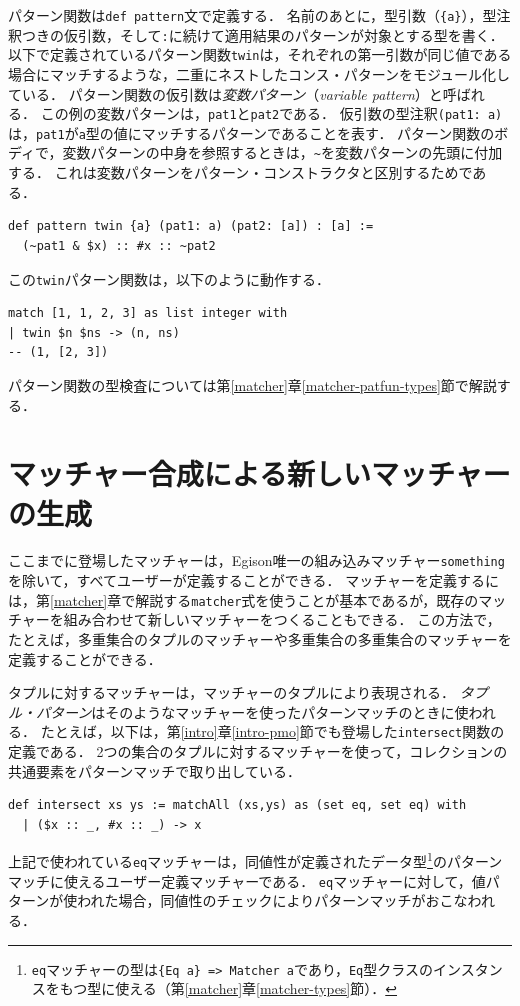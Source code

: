 パターン関数は\lstinline{def pattern}文で定義する．
名前のあとに，型引数（\lstinline|{a}|），型注釈つきの仮引数，そして\lstinline{:}に続けて適用結果のパターンが対象とする型を書く．
以下で定義されているパターン関数\lstinline{twin}は，それぞれの第一引数が同じ値である場合にマッチするような，二重にネストしたコンス・パターンをモジュール化している．
パターン関数の仮引数は\emph{変数パターン}（\emph{variable pattern}）と呼ばれる．
この例の変数パターンは，\lstinline{pat1}と\lstinline{pat2}である．
仮引数の型注釈\lstinline{(pat1: a)}は，\lstinline{pat1}が\lstinline{a}型の値にマッチするパターンであることを表す．
パターン関数のボディで，変数パターンの中身を参照するときは，\lstinline{~}を変数パターンの先頭に付加する．
これは変数パターンをパターン・コンストラクタと区別するためである．
\begin{lstlisting}[language=egison,numbers=none]
def pattern twin {a} (pat1: a) (pat2: [a]) : [a] :=
  (~pat1 & $x) :: #x :: ~pat2
\end{lstlisting}
この\lstinline{twin}パターン関数は，以下のように動作する．
\begin{lstlisting}[language=egison,numbers=none]
match [1, 1, 2, 3] as list integer with
| twin $n $ns -> (n, ns)
-- (1, [2, 3])
\end{lstlisting}
パターン関数の型検査については第\ref{matcher}章\ref{matcher-patfun-types}節で解説する．

\section{マッチャー合成による新しいマッチャーの生成}\label{quick-matcher-composition}

ここまでに登場したマッチャーは，Egison唯一の組み込みマッチャー\lstinline{something}を除いて，すべてユーザーが定義することができる．
マッチャーを定義するには，第\ref{matcher}章で解説する\lstinline{matcher}式を使うことが基本であるが，既存のマッチャーを組み合わせて新しいマッチャーをつくることもできる．
この方法で，たとえば，多重集合のタプルのマッチャーや多重集合の多重集合のマッチャーを定義することができる．

タプルに対するマッチャーは，マッチャーのタプルにより表現される．
\emph{タプル・パターン}はそのようなマッチャーを使ったパターンマッチのときに使われる．
たとえば，以下は，第\ref{intro}章\ref{intro-pmo}節でも登場した\lstinline{intersect}関数の定義である．
2つの集合のタプルに対するマッチャーを使って，コレクションの共通要素をパターンマッチで取り出している．
\begin{lstlisting}[language=egison,numbers=none]
def intersect xs ys := matchAll (xs,ys) as (set eq, set eq) with
  | ($x :: _, #x :: _) -> x
\end{lstlisting}
上記で使われている\lstinline{eq}マッチャーは，同値性が定義されたデータ型\footnote{\lstinline{eq}マッチャーの型は\lstinline|{Eq a} => Matcher a|であり，\lstinline{Eq}型クラスのインスタンスをもつ型に使える（第\ref{matcher}章\ref{matcher-types}節）．}のパターンマッチに使えるユーザー定義マッチャーである．
\lstinline{eq}マッチャーに対して，値パターンが使われた場合，同値性のチェックによりパターンマッチがおこなわれる．

